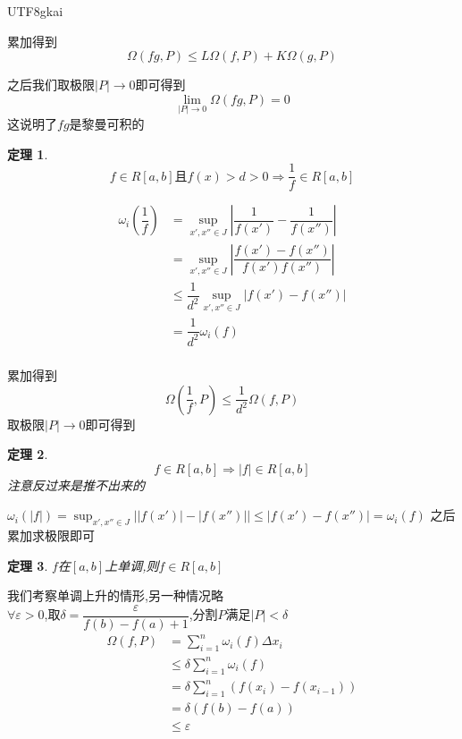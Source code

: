 \documentclass{article}
\newtheorem{theorem}{定理}[subsection]
\newenvironment{cproof}{%
\heiti{证明}\kaishu
}{%
}
\newcommand{\abs}[1]{\left|#1\right|}
\begin{document}
\begin{CJK}{UTF8}{gkai}
\begin{cproof}
  累加得到
  \[\Omega(fg,P) \leq L\Omega(f,P) + K\Omega(g,P)\]

  之后我们取极限$|P|\to 0$即可得到
  \[\lim_{|P|\to 0} \Omega(fg, P) = 0\]
  这说明了$fg$是黎曼可积的
\end{cproof}

\begin{theorem}
  \[f\in R[a,b] \text{且} f(x) > d > 0\Rightarrow \dfrac{1}{f} \in R[a,b]\]
\end{theorem}

\begin{cproof}
  \[
  \begin{aligned}
  \omega_i(\dfrac{1}{f}) &= \sup_{x',x''\in J}\abs{\dfrac{1}{f(x')} - \dfrac{1}{f(x'')}} \\
  &= \sup_{x',x''\in J}\abs{\dfrac{f(x') - f(x'')}{f(x')f(x'')}}\\ 
  &\leq \dfrac{1}{d^2}\sup_{x',x''\in J}|f(x') - f(x'')|\\
  &=\dfrac{1}{d^2}\omega_i(f)    \\
  \end{aligned}
  \]

  累加得到\[\Omega(\dfrac{1}{f},P) \leq  \dfrac{1}{d^2}\Omega(f,P)\]
  取极限$|P|\to 0$即可得到
\end{cproof}

\begin{theorem}
  \[f\in R[a,b] \Rightarrow |f| \in R[a,b]\]
  注意反过来是推不出来的
\end{theorem}

\begin{cproof}
  $\omega_i(|f|) = \sup_{x',x''\in J}\left||f(x')|- |f(x'')|\right| \leq |f(x') - f(x'')| = \omega_i(f)$
  之后累加求极限即可
\end{cproof}

\begin{theorem}
  $f$在$[a,b]$上单调,则$f \in R[a,b]$\\
\end{theorem}

\begin{cproof}
我们考察单调上升的情形,另一种情况略\\

$\forall \varepsilon > 0 $,取$\delta  = \dfrac{\varepsilon}{f(b) - f(a) + 1}$,分割$P$满足$|P| < \delta$
\[
\begin{aligned}
\Omega(f,P) &= \sum_{i = 1}^{n}\omega_i(f)\Delta x_i\\
&\leq \delta \sum_{i = 1}^{n}\omega_i(f) \\
&=  \delta \sum_{i = 1}^{n}(f(x_i) - f(x_{i - 1}))\\
&=  \delta (f(b) - f(a))\\
&\leq \varepsilon\\
\end{aligned}
\]
\end{cproof}


\end{CJK}
\end{document}
